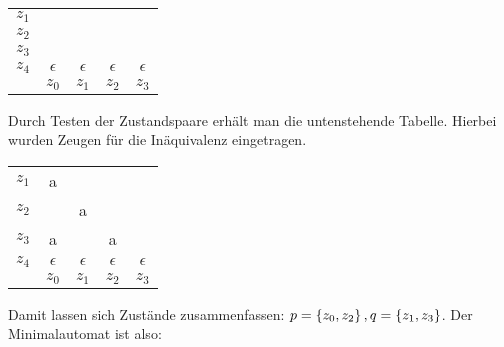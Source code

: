 \begin{tabular}{ccccc}
	\cline{2-2}
	$z_1$ & 	\multicolumn{1}{|c|}{ }		&				&				&			 \\
	\cline{2-3}
	$z_2$ & 	\multicolumn{1}{|c|}{ }		&		\multicolumn{1}{c|}{ }		&				&			 \\
	\cline{2-4}
	$z_3$ & 	\multicolumn{1}{|c|}{ }		&		\multicolumn{1}{c|}{ }		&		\multicolumn{1}{c|}{ }		&			 \\
	\cline{2-5}
	$z_4$ & 	\multicolumn{1}{|c|}{$\epsilon$}		&		\multicolumn{1}{c|}{$\epsilon$}		&		\multicolumn{1}{c|}{$\epsilon$}		&		\multicolumn{1}{c|}{$\epsilon$}	 \\
	\cline{2-5}
				& $z_0$ & $z_1$ & $z_2$ & $z_3$\\
\end{tabular}

Durch Testen der Zustandspaare erhält man die untenstehende Tabelle. Hierbei wurden Zeugen für die Inäquivalenz eingetragen.

\begin{tabular}{ccccc}
	\cline{2-2}
	$z_1$ & 	\multicolumn{1}{|c|}{a}		&				&				&			 \\
	\cline{2-3}
	$z_2$ & 	\multicolumn{1}{|c|}{ }		&		\multicolumn{1}{c|}{a}		&				&			 \\
	\cline{2-4}
	$z_3$ & 	\multicolumn{1}{|c|}{a}		&		\multicolumn{1}{c|}{ }		&		\multicolumn{1}{c|}{a}		&			 \\
	\cline{2-5}
	$z_4$ & 	\multicolumn{1}{|c|}{$\epsilon$}		&		\multicolumn{1}{c|}{$\epsilon$}		&		\multicolumn{1}{c|}{$\epsilon$}		&		\multicolumn{1}{c|}{$\epsilon$}	 \\
	\cline{2-5}
				& $z_0$ & $z_1$ & $z_2$ & $z_3$\\
\end{tabular}

Damit lassen sich Zustände zusammenfassen: $p=\left\{ z_0,z_2 \right\}, q=\left\{ z_1,z_3 \right\}$. Der Minimalautomat ist also:

\vspace{1em}


